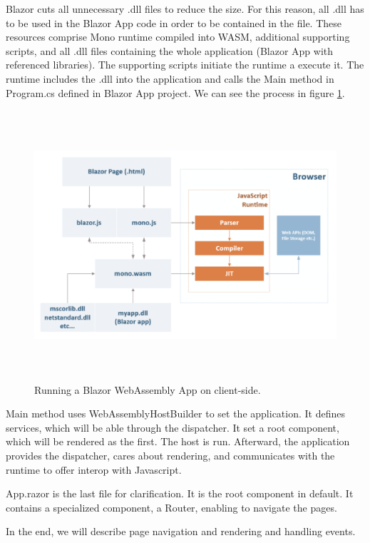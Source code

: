 Blazor cuts all unnecessary .dll files to reduce the size.
For this reason, all .dll has to be used in the Blazor App code in order to be contained in the file. 
These resources comprise Mono runtime compiled into WASM, additional supporting scripts, and all .dll files containing the whole application (Blazor App with referenced libraries).
The supporting scripts initiate the runtime a execute it.
The runtime includes the .dll into the application and calls the Main method in Program.cs defined in Blazor App project.
We can see the process in figure \ref{img07:wasm}.
\par
\begin{figure}[H]\centering
\includegraphics[width=140mm, height=100mm]{./img/BlazorExecution}
\caption{Running a Blazor WebAssembly App on client-side.}
\label{img07:wasm}
\end{figure}
\par
Main method uses WebAssemblyHostBuilder to set the application.
It defines services, which will be able through the dispatcher.
It set a root component, which will be rendered as the first.
The host is run.
Afterward, the application provides the dispatcher, cares about rendering, and communicates with the runtime to offer interop with Javascript.
\par
App.razor is the last file for clarification.
It is the root component in default.
It contains a specialized component, a Router, enabling to navigate the pages.
\par
In the end, we will describe page navigation and rendering and handling events.
